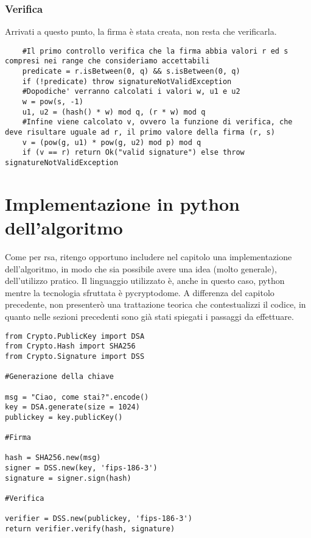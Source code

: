 \newpage

\subsubsection{Verifica}

Arrivati a questo punto, la firma è stata creata, non resta che verificarla. 

\begin{lstlisting}
	#Il primo controllo verifica che la firma abbia valori r ed s compresi nei range che consideriamo accettabili
	predicate = r.isBetween(0, q) && s.isBetween(0, q)
	if (!predicate) throw signatureNotValidException
	#Dopodiche' verranno calcolati i valori w, u1 e u2
	w = pow(s, -1)
	u1, u2 = (hash() * w) mod q, (r * w) mod q
	#Infine viene calcolato v, ovvero la funzione di verifica, che deve risultare uguale ad r, il primo valore della firma (r, s)
	v = (pow(g, u1) * pow(g, u2) mod p) mod q
	if (v == r) return Ok("valid signature") else throw signatureNotValidException 
\end{lstlisting}

\section{Implementazione in python dell'algoritmo}

Come per rsa, ritengo opportuno includere nel capitolo una implementazione dell'algoritmo, in modo che sia possibile avere una idea (molto generale), dell'utilizzo pratico. Il linguaggio utilizzato è, anche in questo caso, python mentre la tecnologia sfruttata è pycryptodome. A differenza del capitolo precedente, non presenterò una trattazione teorica che contestualizzi il codice, in quanto nelle sezioni precedenti sono già stati spiegati i passaggi da effettuare.

\begin{lstlisting}
from Crypto.PublicKey import DSA
from Crypto.Hash import SHA256
from Crypto.Signature import DSS

#Generazione della chiave

msg = "Ciao, come stai?".encode()
key = DSA.generate(size = 1024)
publickey = key.publicKey()

#Firma

hash = SHA256.new(msg)
signer = DSS.new(key, 'fips-186-3')
signature = signer.sign(hash)

#Verifica

verifier = DSS.new(publickey, 'fips-186-3')
return verifier.verify(hash, signature)

\end{lstlisting}


